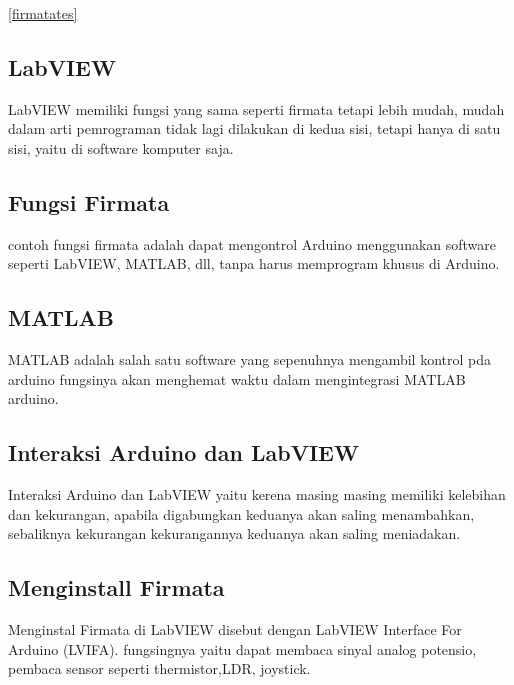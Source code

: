 	\ref{firmatates}
	
	
	\subsection{LabVIEW}
	LabVIEW memiliki fungsi yang sama seperti firmata tetapi lebih mudah, mudah dalam arti pemrograman tidak lagi dilakukan di kedua sisi,
	tetapi hanya di satu sisi, yaitu di software komputer saja.
	
	\subsection{Fungsi Firmata}
	contoh fungsi firmata adalah dapat mengontrol Arduino menggunakan software seperti LabVIEW, MATLAB, dll, tanpa harus memprogram khusus di Arduino.
	
	\subsection{MATLAB}
	MATLAB adalah salah satu software yang sepenuhnya mengambil kontrol pda arduino fungsinya akan menghemat waktu dalam mengintegrasi MATLAB arduino.
	
	\subsection{Interaksi Arduino dan LabVIEW}
	Interaksi Arduino dan LabVIEW yaitu kerena masing masing memiliki kelebihan dan kekurangan, apabila digabungkan keduanya akan saling menambahkan,
	sebaliknya kekurangan kekurangannya keduanya akan saling meniadakan.
	
	\subsection{Menginstall Firmata}
	Menginstal Firmata di LabVIEW disebut dengan LabVIEW Interface For Arduino (LVIFA). fungsingnya yaitu dapat membaca sinyal analog potensio,
	pembaca sensor seperti thermistor,LDR, joystick.